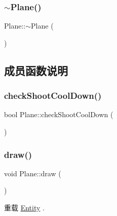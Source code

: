 \mbox{\label{class_plane_a69abd86051c880dcb44b249ad10c4436}} 
\subsubsection{\texorpdfstring{$\sim$\+Plane()}{~Plane()}}
{\footnotesize\ttfamily Plane\+::$\sim$\+Plane (\begin{DoxyParamCaption}{ }\end{DoxyParamCaption})}



\subsection{成员函数说明}
\mbox{\label{class_plane_a77bd3df33921e215669be6583619ee45}} 
\subsubsection{\texorpdfstring{check\+Shoot\+Cool\+Down()}{checkShootCoolDown()}}
{\footnotesize\ttfamily bool Plane\+::check\+Shoot\+Cool\+Down (\begin{DoxyParamCaption}{ }\end{DoxyParamCaption})\hspace{0.3cm}{\ttfamily [protected]}}

\mbox{\label{class_plane_a8877358878e91929c4c01bad40cbdb78}} 
\subsubsection{\texorpdfstring{draw()}{draw()}}
{\footnotesize\ttfamily void Plane\+::draw (\begin{DoxyParamCaption}{ }\end{DoxyParamCaption})\hspace{0.3cm}{\ttfamily [virtual]}}



重载 \hyperlink{class_entity_a7666f416dd0d1fce0f1133f78df44476}{Entity} .

\mbox{\label{class_plane_ad63d1e65ff9ca0d8b0ea1f6d37c55388}} 
